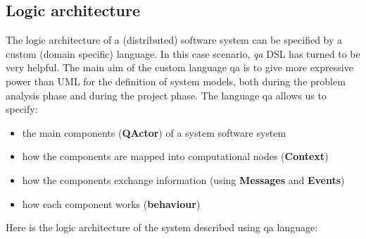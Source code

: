 \subsection{Logic architecture}
The logic architecture of a (distributed) software system can be specified by a custom (domain specific) language. In this case scenario, \textit{qa} DSL has turned to be very helpful. The main aim of the custom language qa is to give more expressive power than UML for the definition of system models, both during the problem analysis phase and during the project phase. The language qa allows us to specify:
\begin{itemize}
	\item the main components (\textbf{QActor}) of a system software system
	\item how the components are mapped into computational nodes (\textbf{Context})
	\item how the components exchange information (using \textbf{Messages} and \textbf{Events})
	\item how each component works (\textbf{behaviour})
\end{itemize}
Here is the logic architecture of the system described using qa language:
